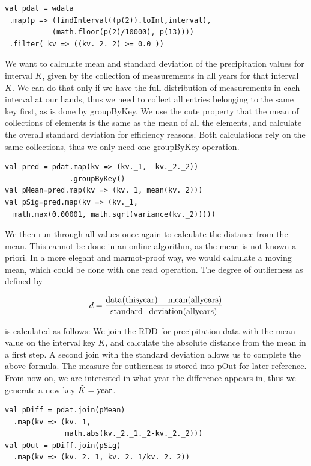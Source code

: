 \documentclass[
10pt, %
a4paper, %
oneside, %
headinclude,footinclude, %
useAMS,
usenatbib
]{template/mn2e}  %
\begin{document}
\begin{verbatim}
val pdat = wdata
 .map(p => (findInterval((p(2)).toInt,interval),
           (math.floor(p(2)/10000), p(13))))
 .filter( kv => ((kv._2._2) >= 0.0 ))
\end{verbatim}

We want to calculate mean and standard deviation of the precipitation values for interval $K$, given by the collection of measurements in all years for that interval $K$. We can do that only if we have the full distribution of measurements in each interval at our hands, thus we need to collect all entries belonging to the same key first, as is done by groupByKey. We use the cute property that the mean of collections of elements is the same as the mean of all the elements, and calculate the overall standard deviation for efficiency reasons. Both calculations rely on the same collections, thus we only need one groupByKey operation.

\begin{verbatim}
val pred = pdat.map(kv => (kv._1,  kv._2._2))
               .groupByKey()
val pMean=pred.map(kv => (kv._1, mean(kv._2)))
val pSig=pred.map(kv => (kv._1,
  math.max(0.00001, math.sqrt(variance(kv._2)))))
\end{verbatim}

We then run through all values once again to calculate the distance from the mean. This cannot be done in an online algorithm, as the mean is not known a-priori. In a more elegant and marmot-proof way, we would calculate a moving mean, which could be done with one read operation. The degree of outlierness as defined by

\begin{equation*}
d = \frac{\rm{data}(\rm{this year}) - \rm{mean}(\rm{all years})}{\rm{standard\_deviation}(\rm{all years})}
\end{equation*}

is calculated as follows: We join the RDD for precipitation data with the mean value on the interval key $K$, and calculate the absolute distance from the mean in a first step. A second join with the standard deviation allows us to complete the above formula. The measure for outlierness is stored into pOut for later reference.  From now on, we are interested in what year the difference appears in, thus we generate a new key $\tilde{K}=\rm{year}$.

\begin{verbatim}
val pDiff = pdat.join(pMean)
  .map(kv => (kv._1,
              math.abs(kv._2._1._2-kv._2._2)))
val pOut = pDiff.join(pSig)
  .map(kv => (kv._2._1, kv._2._1/kv._2._2))
\end{verbatim}
\end{document}
